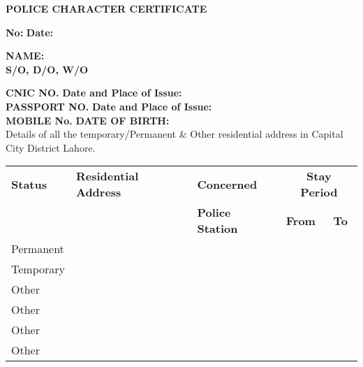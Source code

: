 \documentclass{article}
\begin{document}
\begin{center}
\textbf{POLICE CHARACTER CERTIFICATE}
\end{center}

\textbf{No:} \hspace{2cm}
\textbf{Date:} \hspace{2cm}

\textbf{NAME:} \hspace{2cm} \\
\textbf{S/O, D/O, W/O} \hspace{2cm}

\textbf{CNIC NO.} \hspace{2cm} \underline{\hspace{4cm}} \hspace{1cm} \textbf{Date and Place of Issue:} \hspace{2cm} \underline{\hspace{4cm}} \\

\textbf{PASSPORT NO.} \hspace{2cm} \underline{\hspace{4cm}} \hspace{1cm} \textbf{Date and Place of Issue:} \hspace{2cm} \underline{\hspace{4cm}} \\

\textbf{MOBILE No.} \hspace{2cm} \underline{\hspace{4cm}} \hspace{1cm} \textbf{DATE OF BIRTH:} \hspace{2cm} \underline{\hspace{4cm}} \\

Details of all the temporary/Permanent \& Other residential address in Capital City District Lahore.

\begin{tabular}{|l|l|l|l|l|}
\hline
\textbf{Status} & \textbf{Residential Address} & \textbf{Concerned} & \multicolumn{2}{c|}{\textbf{Stay Period}} \\
 &  & \textbf{Police Station} & \textbf{From} & \textbf{To} \\ \hline
Permanent &  &  &  &  \\ \hline
Temporary &  &  &  &  \\ \hline
Other &  &  &  &  \\ \hline
Other &  &  &  &  \\ \hline
Other &  &  &  &  \\ \hline
Other &  &  &  &  \\ \hline
\end{tabular}
\end{document}
